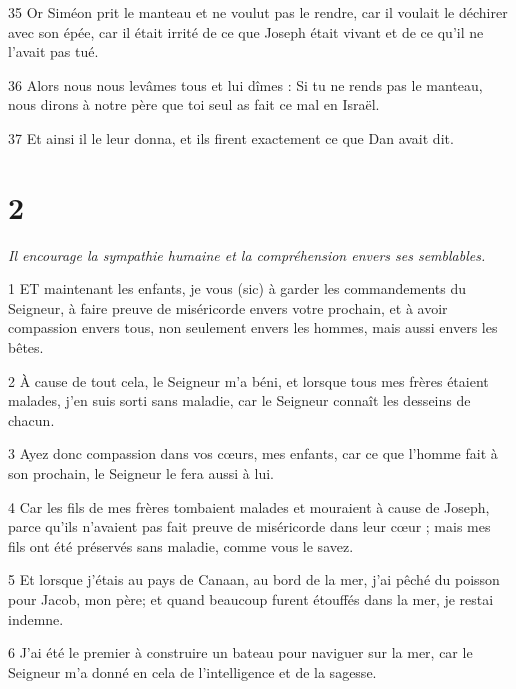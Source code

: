 \par 35 Or Siméon prit le manteau et ne voulut pas le rendre, car il voulait le déchirer avec son épée, car il était irrité de ce que Joseph était vivant et de ce qu'il ne l'avait pas tué.

\par 36 Alors nous nous levâmes tous et lui dîmes : Si tu ne rends pas le manteau, nous dirons à notre père que toi seul as fait ce mal en Israël.

\par 37 Et ainsi il le leur donna, et ils firent exactement ce que Dan avait dit.

\chapter{2}

\par \textit{Il encourage la sympathie humaine et la compréhension envers ses semblables.}

\par 1 ET maintenant les enfants, je vous (sic) à garder les commandements du Seigneur, à faire preuve de miséricorde envers votre prochain, et à avoir compassion envers tous, non seulement envers les hommes, mais aussi envers les bêtes.

\par 2 À cause de tout cela, le Seigneur m'a béni, et lorsque tous mes frères étaient malades, j'en suis sorti sans maladie, car le Seigneur connaît les desseins de chacun.

\par 3 Ayez donc compassion dans vos cœurs, mes enfants, car ce que l'homme fait à son prochain, le Seigneur le fera aussi à lui.

\par 4 Car les fils de mes frères tombaient malades et mouraient à cause de Joseph, parce qu'ils n'avaient pas fait preuve de miséricorde dans leur cœur ; mais mes fils ont été préservés sans maladie, comme vous le savez.

\par 5 Et lorsque j'étais au pays de Canaan, au bord de la mer, j'ai pêché du poisson pour Jacob, mon père; et quand beaucoup furent étouffés dans la mer, je restai indemne.

\par 6 J'ai été le premier à construire un bateau pour naviguer sur la mer, car le Seigneur m'a donné en cela de l'intelligence et de la sagesse.

